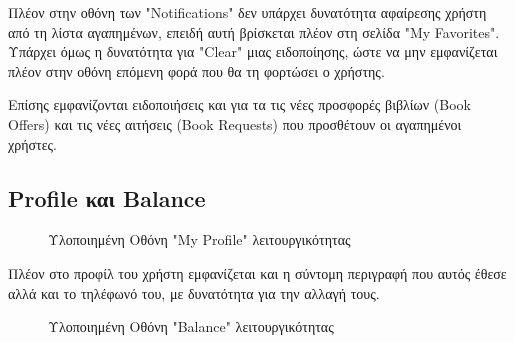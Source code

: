 \documentclass[12pt,a4paper]{article}
\begin{document}
Πλέον στην οθόνη των "Notifications" δεν υπάρχει δυνατότητα αφαίρεσης χρήστη από τη λίστα αγαπημένων, επειδή αυτή βρίσκεται πλέον στη σελίδα "My Favorites". Υπάρχει όμως η δυνατότητα για "Clear" μιας ειδοποίησης, ώστε να μην εμφανίζεται πλέον στην οθόνη επόμενη φορά που θα τη φορτώσει ο χρήστης. 

Επίσης εμφανίζονται ειδοποιήσεις και για τα τις νέες προσφορές βιβλίων (Book Offers) και τις νέες αιτήσεις (Book Requests) που προσθέτουν οι αγαπημένοι χρήστες.

\subsection{Profile και Balance}

\begin{figure}[H]
	\caption{Υλοποιημένη Οθόνη "My Profile" λειτουργικότητας}
	\label{Υλοποιημένη Οθόνη "My Profile" λειτουργικότητας}
\end{figure}

Πλέον στο προφίλ του χρήστη εμφανίζεται και η σύντομη περιγραφή που αυτός έθεσε αλλά και το τηλέφωνό του, με δυνατότητα για την αλλαγή τους. 

\begin{figure}[H]
	\caption{Υλοποιημένη Οθόνη "Balance" λειτουργικότητας}
	\label{Υλοποιημένη Οθόνη "Balance" λειτουργικότητας}
\end{figure}
\end{document}
